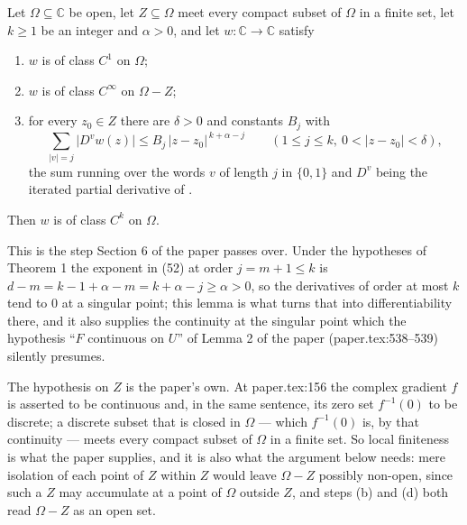 \begin{lemma}
Let $\Omega\subseteq\mathbb{C}$ be open, let $Z\subseteq\Omega$ meet every
compact subset of $\Omega$ in a finite set, let $k\ge1$ be an integer and
$\alpha>0$, and let $w\colon\mathbb{C}\to\mathbb{C}$ satisfy
\begin{enumerate}
\item[(H1)] $w$ is of class $C^1$ on $\Omega$;
\item[(H2)] $w$ is of class $C^\infty$ on $\Omega-Z$;
\item[(H3)] for every $z_0\in Z$ there are $\delta>0$ and constants $B_j$ with
\[
  \sum_{|v|=j}\bigl|D^{v}w(z)\bigr|\le B_j\,|z-z_0|^{\,k+\alpha-j}
  \qquad(1\le j\le k,\ 0<|z-z_0|<\delta),
\]
the sum running over the words $v$ of length $j$ in $\{0,1\}$ and $D^{v}$ being
the iterated partial derivative of .
\end{enumerate}
Then $w$ is of class $C^{k}$ on $\Omega$.

This is the step Section 6 of the paper passes over.  Under the hypotheses of
Theorem 1 the exponent in (52) at order $j=m+1\le k$ is
$d-m=k-1+\alpha-m=k+\alpha-j\ge\alpha>0$, so the derivatives of order at most
$k$ tend to $0$ at a singular point; this lemma is what turns that into
differentiability there, and it also supplies the continuity at the singular
point which the hypothesis ``$F$ continuous on $U$'' of Lemma 2 of the paper
(paper.tex:538--539) silently presumes.

The hypothesis on $Z$ is the paper's own.  At paper.tex:156 the complex
gradient $f$ is asserted to be continuous and, in the same sentence, its zero
set $f^{-1}(0)$ to be discrete; a discrete subset that is closed in $\Omega$ ---
which $f^{-1}(0)$ is, by that continuity --- meets every compact subset of
$\Omega$ in a finite set.  So local finiteness is what the paper supplies, and
it is also what the argument below needs: mere isolation of each point of $Z$
within $Z$ would leave $\Omega-Z$ possibly non-open, since such a $Z$ may
accumulate at a point of $\Omega$ outside $Z$, and steps (b) and (d) both read
$\Omega-Z$ as an open set.
\end{lemma}
